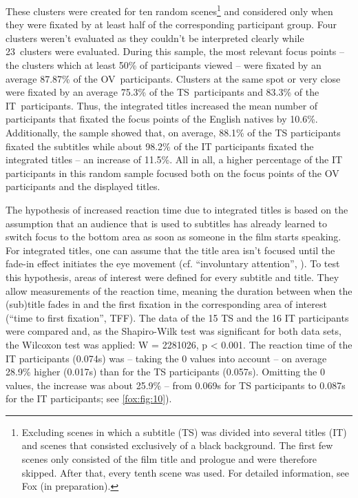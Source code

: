 \documentclass[output=paper]{langsci/langscibook}
\begin{document}
These clusters were created for ten random scenes\footnote{Excluding scenes in which a subtitle (TS) was divided into several titles (IT) and scenes that consisted exclusively of a black background. The first few scenes only consisted of the film title and prologue and were therefore skipped. After that, every tenth scene was used. For detailed information, see Fox (in preparation).} and considered only when they were fixated by at least half of the corresponding participant group. Four clusters weren't evaluated as they couldn't be interpreted clearly while 23~clusters were evaluated. During this sample, the most relevant focus points – the clusters which at least 50\% of participants viewed – were fixated by an average 87.87\% of the OV~participants. Clusters at the same spot or very close were fixated by an average 75.3\% of the TS~participants and 83.3\% of the IT~participants. Thus, the integrated titles increased the mean number of participants that fixated the focus points of the English natives by 10.6\%. Additionally, the sample showed that, on average, 88.1\% of the TS participants fixated the subtitles while about 98.2\% of the IT participants fixated the integrated titles – an increase of 11.5\%. All in all, a higher percentage of the IT participants in this random sample focused both on the focus points of the OV participants and the displayed titles.



The hypothesis of increased reaction time due to integrated titles is based on the assumption that an audience that is used to subtitles has already learned to switch focus to the bottom area as soon as someone in the film starts speaking. For integrated titles, one can assume that the title area isn't focused until the fade-in effect initiates the eye movement (cf. ``involuntary attention'', \citealt[74]{prinzmetal2005}). To test this hypothesis, areas of interest were defined for every subtitle and title. They allow measurements of the reaction time, meaning the duration between when the (sub)title fades in and the first fixation in the corresponding area of interest (``time to first fixation'', TFF). The data of the 15 TS and the 16 IT participants were compared and, as the Shapiro-Wilk test was significant for both data sets, the Wilcoxon test was applied: W = 2281026, p {\textless} 0.001. The reaction time of the IT participants (0.074s) was – taking the 0 values into account – on average 28.9\% higher (0.017s) than for the TS participants (0.057s). Omitting the 0 values, the increase was about 25.9\% – from 0.069s for TS participants to 0.087s for the IT participants; see \autoref{fox:fig:10}).
\end{document}
